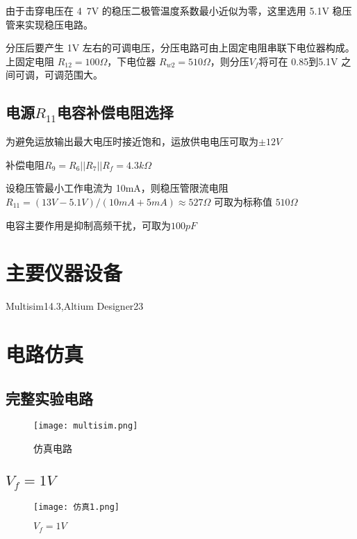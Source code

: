\documentclass{zjureport}
\begin{document}
由于击穿电压在 4~7V 的稳压二极管温度系数最小近似为零，这里选用 5.1V 稳压管来实现稳压电路。\par

分压后要产生 1V 左右的可调电压，分压电路可由上固定电阻串联下电位器构成。上固定电阻 $R_{12}=100\Omega$，下电位器 $R_{w2} = 510\Omega$，则分压$V_f$将可在 0.85到5.1V 之间可调，可调范围大。

\subsection{电源$R_{11}$电容补偿电阻选择}
为避免运放输出最大电压时接近饱和，运放供电电压可取为$\pm 12V$

补偿电阻$R_9 = R_6||R_7||R_f = 4.3k\Omega$\par

设稳压管最小工作电流为 10mA，则稳压管限流电阻 
\begin{math}
  R_{11} = (13V - 5.1V)/(10mA+5mA)\approx527\Omega
\end{math}
可取为标称值 $510\Omega$\par

电容主要作用是抑制高频干扰，可取为$100pF$

\section{主要仪器设备}
Multisim14.3,Altium Designer23

\section{电路仿真}

\subsection{完整实验电路}
\begin{figure}[H]
  \begin{center}
  \texttt{[image: multisim.png]}
  \end{center}
  \caption{仿真电路}
\end{figure}

\subsection{$V_f = 1V$}
\begin{figure}[h]
  \begin{center}
  \texttt{[image: 仿真1.png]}
  \end{center}
  \caption{$V_f = 1V$}
\end{figure}
\end{document}
